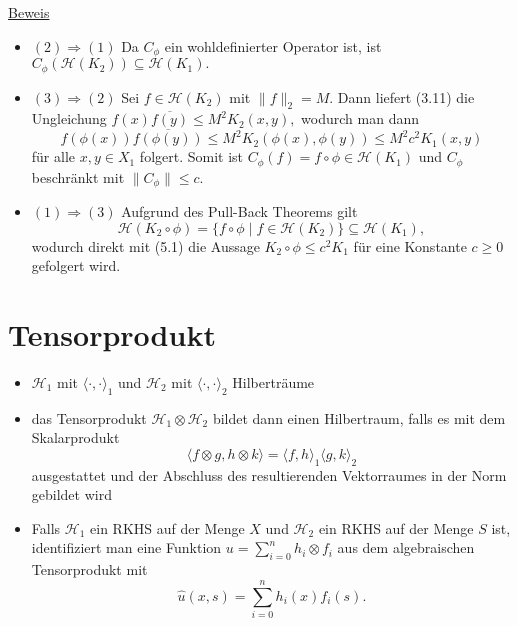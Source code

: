 \documentclass{beamer}
\begin{document}
\begin{frame}
\underline{Beweis}\\
\begin{itemize}
\item $(2)\Rightarrow (1)$ Da $C_{\phi}$ ein wohldefinierter Operator ist, ist $C_{\phi}(\mathcal{H}(K_2))\subseteq \mathcal{H}(K_1).$ \pause
\item $(3) \Rightarrow (2)$ Sei $f\in \mathcal{H}(K_2)$ mit $\|f\|_2=M.$ Dann liefert (3.11) die Ungleichung $f(x)\overline{f(y)}\leq M^2K_2(x,y),$ wodurch man dann 
\[
f(\phi(x))\overline{f(\phi(y))}\leq M^2K_2(\phi(x),\phi(y))\leq M^2c^2K_1(x,y)
\] für alle $x,y\in X_1$ folgert. Somit ist $C_{\phi}(f)=f\circ \phi\in \mathcal{H}(K_1)$ und $C_{\phi}$ beschränkt mit $\|C_{\phi}\|\leq c.$ 
\end{itemize}
\end{frame}

\begin{frame}
\begin{itemize}
\item $(1) \Rightarrow (3)$ Aufgrund des Pull-Back Theorems gilt
 \[
\mathcal{H}(K_2\circ \phi)=\{f\circ \phi\mid f\in \mathcal{H}(K_2)\}\subseteq \mathcal{H}(K_1), 
\] wodurch direkt mit (5.1) die Aussage $K_2\circ \phi \leq c^2K_1$ für eine Konstante $c\geq 0$ gefolgert wird. 
\end{itemize}
\end{frame}
\section{Tensorprodukt}
\begin{frame}
\begin{itemize}
\item $\mathcal{H}_1$ mit $\langle\cdot,\cdot \rangle_1$ und $\mathcal{H}_2$ mit $\langle\cdot,\cdot\rangle_2$ Hilberträume \pause
\item das Tensorprodukt $\mathcal{H}_1\otimes \mathcal{H}_2$ bildet dann einen Hilbertraum, falls es mit dem Skalarprodukt 
\[
\langle f\otimes g,h\otimes k\rangle=\langle f,h\rangle_1\langle g,k\rangle_2
\]
ausgestattet und der Abschluss des resultierenden Vektorraumes in der Norm gebildet wird
\end{itemize}
\end{frame}
\begin{frame}
\begin{itemize}
\item Falls $\mathcal{H}_1$ ein RKHS auf der Menge $X$ und $\mathcal{H}_2$ ein RKHS auf der Menge $S$ ist, identifiziert man eine Funktion $u=\sum_{i=0}^nh_i\otimes f_i$ aus dem algebraischen Tensorprodukt mit
\[
\hat{u}(x,s)=\sum_{i=0}^nh_i(x)f_i(s).
\] 
\end{itemize}
\end{frame}
\end{document}
